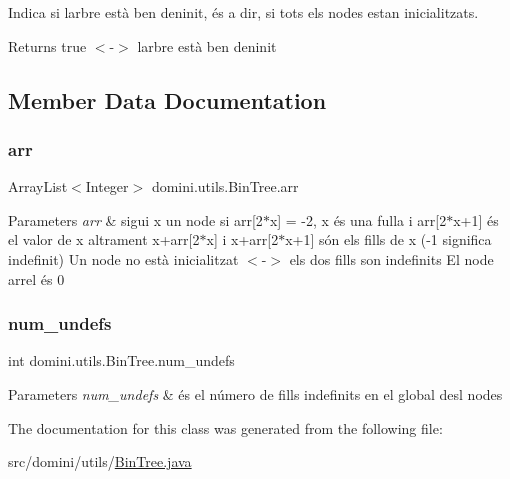 Indica si l\textquotesingle{}arbre està ben deninit, és a dir, si tots els nodes estan inicialitzats. 

\begin{DoxyReturn}{Returns}
true $<$-\/$>$ l\textquotesingle{}arbre està ben deninit 
\end{DoxyReturn}


\subsection{Member Data Documentation}
\mbox{\label{classdomini_1_1utils_1_1BinTree_a357bcbcf07ba7fcb99d11b237d189e65}} 
\subsubsection{\texorpdfstring{arr}{arr}}
{\footnotesize\ttfamily Array\+List$<$Integer$>$ domini.\+utils.\+Bin\+Tree.\+arr\hspace{0.3cm}{\ttfamily [private]}}


\begin{DoxyParams}{Parameters}
{\em arr} & sigui x un node si arr\mbox{[}2$\ast$x\mbox{]} = -\/2, x és una fulla i arr\mbox{[}2$\ast$x+1\mbox{]} és el valor de x altrament x+arr\mbox{[}2$\ast$x\mbox{]} i x+arr\mbox{[}2$\ast$x+1\mbox{]} són els fills de x (-\/1 significa indefinit) Un node no està inicialitzat $<$-\/$>$ els dos fills son indefinits El node arrel és 0 \\
\hline
\end{DoxyParams}
\mbox{\label{classdomini_1_1utils_1_1BinTree_a36f1212262c353accbc0a0385fa45a8d}} 
\subsubsection{\texorpdfstring{num\+\_\+undefs}{num\_undefs}}
{\footnotesize\ttfamily int domini.\+utils.\+Bin\+Tree.\+num\+\_\+undefs\hspace{0.3cm}{\ttfamily [private]}}


\begin{DoxyParams}{Parameters}
{\em num\+\_\+undefs} & és el número de fills indefinits en el global desl nodes \\
\hline
\end{DoxyParams}


The documentation for this class was generated from the following file\+:\begin{DoxyCompactItemize}
\item 
src/domini/utils/\hyperlink{BinTree_8java}{Bin\+Tree.\+java}\end{DoxyCompactItemize}
